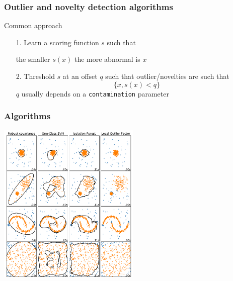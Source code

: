 \documentclass[slidetop,11pt]{beamer}
\begin{document}
\begin{frame}
\frametitle{Outlier and novelty detection algorithms}

Common approach

\vspace{0.5cm}

\begin{enumerate}
\item[1.] Learn a scoring function $s$ such that
\begin{center}
the smaller $s(x)$ the more abnormal is $x$
\end{center}

\vspace{0.5cm}

\item[2.] Threshold $s$ at an offset $q$ such that outlier/novelties are such that
\begin{equation*}
\{x, s(x) < q \}
\end{equation*}
$q$ usually depends on a \texttt{contamination} parameter
\end{enumerate}

\end{frame}


\begin{frame}\frametitle{Algorithms}
    
\begin{center}
\includegraphics[width=6.8cm]{img/anomaly_comparison.pdf}
\end{center}

\end{frame}
\end{document}
